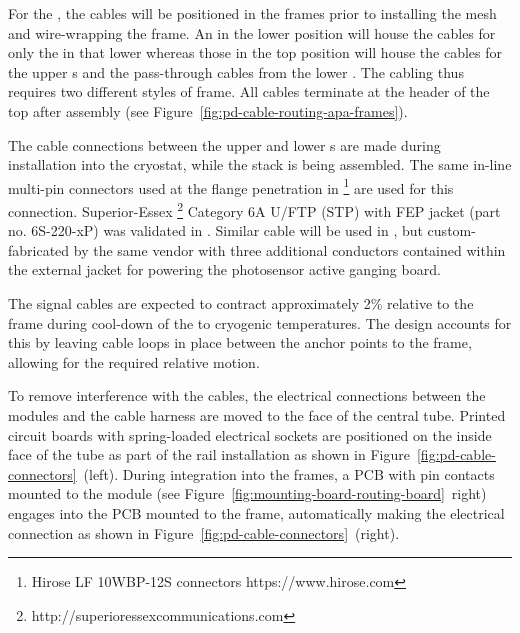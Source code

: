 For the , the  cables will be %
positioned in the  frames prior to installing the %
mesh and wire-wrapping the frame.  %
An  in the lower position will house the cables for only the  in that lower  whereas those in the top position will house the cables for the upper  s and the pass-through cables from the lower . The cabling thus requires two different styles of  frame. All cables terminate at the header of the top  after assembly (see Figure~\ref{fig:pd-cable-routing-apa-frames}).

The cable connections between the upper and lower s are made during  installation into the cryostat, while the  stack is being assembled. The same in-line multi-pin connectors used at the flange penetration in \footnote{Hirose LF 10WBP-12S connectors https://www.hirose.com} are used for this connection.  Superior-Essex \footnote{http://superioressexcommunications.com} Category 6A U/FTP (STP) with FEP jacket (part no. 6S-220-xP) was validated in .  Similar cable will be used in , but custom-fabricated by the same vendor with three additional conductors contained within the external jacket for powering the photosensor active ganging board.


The  signal cables are expected to contract approximately 2\% relative to the  frame during cool-down of the  to cryogenic temperatures.  The design accounts for this by leaving cable loops in place between the anchor points to the  frame, allowing for the required relative motion.


To remove interference with the  cables, the electrical connections between the  modules and the  cable harness are moved to the face of the central  tube.  Printed circuit boards with spring-loaded electrical sockets are positioned on the inside face of the tube as part of the  rail installation as shown in Figure~\ref{fig:pd-cable-connectors}~(left).  During  integration into the  frames, a PCB with pin contacts mounted to the  module (see Figure~\ref{fig:mounting-board-routing-board}~right) engages into the PCB mounted to the  frame, automatically making the electrical connection as shown in 
Figure~\ref{fig:pd-cable-connectors}~(right).

